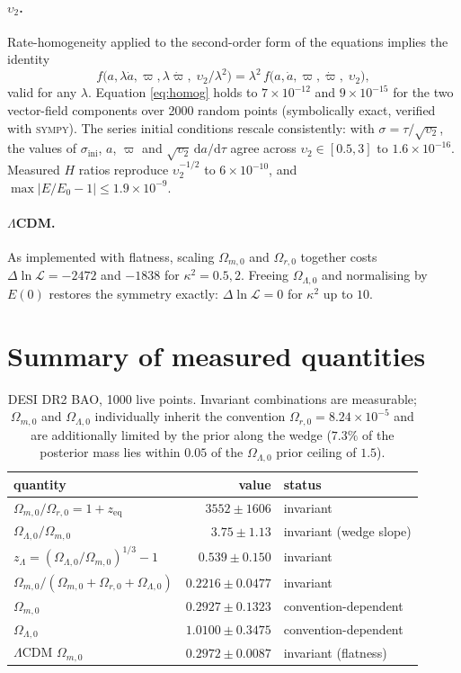 \documentclass[11pt]{article}
\newcommand{\Om}{\Omega_{m,0}}
\newcommand{\Or}{\Omega_{r,0}}
\newcommand{\OL}{\Omega_{\Lambda,0}}
\newcommand{\ups}{\upsilon_2}
\begin{document}
\paragraph{$\ups$.} Rate-homogeneity applied to the second-order form of the
equations implies the identity
\begin{equation}
f\big(a,\lambda\dot a,\varpi,\lambda\dot\varpi,\;\ups/\lambda^2\big)
 = \lambda^2\, f\big(a,\dot a,\varpi,\dot\varpi,\;\ups\big),
\label{eq:homog}
\end{equation}
valid for any $\lambda$. Equation \eqref{eq:homog}
holds to $7\times10^{-12}$ and $9\times10^{-15}$ for the two vector-field
components over 2000 random points (symbolically exact, verified with
\textsc{sympy}). The series initial conditions rescale consistently: with
$\sigma=\tau/\sqrt{\ups}$, the values of $\sigma_{\mathrm{ini}}$, $a$, $\varpi$
and $\sqrt{\ups}\,\mathrm da/\mathrm d\tau$ agree across $\ups\in[0.5,3]$ to
$1.6\times10^{-16}$. Measured $H$ ratios reproduce $\ups^{-1/2}$ to
$6\times10^{-10}$, and $\max|E/E_0-1|\le1.9\times10^{-9}$.

\paragraph{$\Lambda$CDM.} As implemented with flatness, scaling $\Om$ and $\Or$
together costs $\Delta\ln\mathcal{L}=-2472$ and $-1838$ for $\kappa^2=0.5,2$. Freeing
$\OL$ and normalising by $E(0)$ restores the symmetry exactly:
$\Delta\ln\mathcal{L}=0$ for $\kappa^2$ up to $10$.

\section{Summary of measured quantities}

\begin{table}[h]\centering
\caption{DESI DR2 BAO, 1000 live points. Invariant combinations are measurable;
$\Om$ and $\OL$ individually inherit the convention $\Or=8.24\times10^{-5}$ and
are additionally limited by the prior along the wedge ($7.3\%$ of the posterior
mass lies within $0.05$ of the $\OL$ prior ceiling of $1.5$).}
\small
\begin{tabular}{lrl}
\toprule
quantity & value & status \\
\midrule
$\Om/\Or = 1+z_{\mathrm{eq}}$ & $3552 \pm 1606$ & invariant \\
$\OL/\Om$ & $3.75 \pm 1.13$ & invariant (wedge slope) \\
$z_\Lambda = (\OL/\Om)^{1/3}-1$ & $0.539 \pm 0.150$ & invariant \\
$\Om/(\Om{+}\Or{+}\OL)$ & $0.2216 \pm 0.0477$ & invariant \\
\midrule
$\Om$ & $0.2927 \pm 0.1323$ & convention-dependent \\
$\OL$ & $1.0100 \pm 0.3475$ & convention-dependent \\
\midrule
$\Lambda$CDM $\Om$ & $0.2972 \pm 0.0087$ & invariant (flatness) \\
\bottomrule
\end{tabular}
\end{table}
\end{document}
